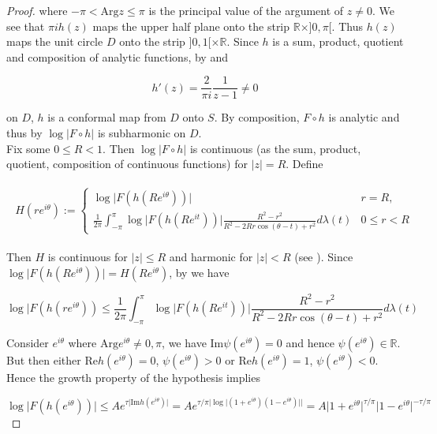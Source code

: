 \begin{proof}
where $-\pi < \mathrm{Arg} z \leqslant \pi$ is the principal value of the argument of $z \neq 0$.  We see that $\pi i h(z)$ maps the upper half plane onto the strip $\mathbb{R} \times ]0,\pi[$. Thus $h(z)$ maps the unit circle $D$ onto the strip $]0,1[ \times \mathbb{R}$. Since $h$ is a sum, product, quotient and composition of analytic functions, by \cite[278--279]{rudin:rc_analysis:1987} and

\begin{equation}
	h'(z) = \frac{2}{\pi i} \frac{1}{z - 1} \neq 0
\end{equation}

on $D$, $h$ is a conformal map from $D$ onto $S$. By composition, $F \circ h$ is analytic and thus by \cite[336]{rudin:rc_analysis:1987} $\log\vert F \circ h \vert$ is subharmonic on $D$.\\
Fix some $0 \leqslant R < 1$. Then $\log\vert F \circ h \vert$ is continuous (as the sum, product, quotient, composition of continuous functions) for $\vert z \vert = R$. Define 

\begin{gather*}
	\begin{aligned}
		H(re^{i\theta}):= \begin{cases}
			\displaystyle
			\log \vert F(h(Re^{i\theta}))\vert & r = R,\\
			\displaystyle
			\frac{1}{2\pi} \int_{-\pi}^\pi \log\vert F(h(Re^{it}))\vert \frac{R^2 - r^2}{R^2 - 2Rr\cos(\theta - t) + r^2} d\lambda(t) & 0 \leqslant r < R
	\end{cases}
	\end{aligned}
\end{gather*}

Then $H$ is continuous for $\vert z \vert \leqslant R$ and harmonic for $\vert z \vert < R$ (see \cite[234--235]{rudin:rc_analysis:1987}). Since $\log\vert F(h(Re^{i\theta}))\vert = H(Re^{i\theta})$, by \cite[336]{rudin:rc_analysis:1987} we have

\begin{equation}
	\log\vert F(h(re^{i\theta})) \leqslant \frac{1}{2\pi} \int_{-\pi}^\pi \log\vert F(h(Re^{it}))\vert \frac{R^2 - r^2}{R^2 - 2Rr\cos(\theta - t) + r^2} d\lambda(t) 
\end{equation}

Consider $e^{i\theta}$ where $\mathrm{Arg}e^{i\theta} \neq 0,\pi$, we have $\mathrm{Im}\psi(e^{i\theta}) = 0$ and hence $\psi(e^{i\theta}) \in \mathbb{R}$. But then either $\mathrm{Re}h(e^{i\theta}) = 0$, $\psi(e^{i\theta}) > 0$ or $\mathrm{Re}h(e^{i\theta}) = 1$, $\psi(e^{i\theta}) < 0$. Hence the growth property of the hypothesis implies

\begin{equation}
		\log \vert F(h(e^{i\theta})) \vert \leqslant Ae^{\tau\vert \mathrm{Im} h(e^{i\theta})\vert} = Ae^{\tau/\pi\vert \log\vert (1 + e^{i\theta})(1 - e^{i\theta})\vert\vert} = A \vert 1 + e^{i\theta}\vert^{\tau/\pi} \vert 1 - e^{i\theta} \vert^{-\tau/\pi}
\end{equation}



\end{proof}

